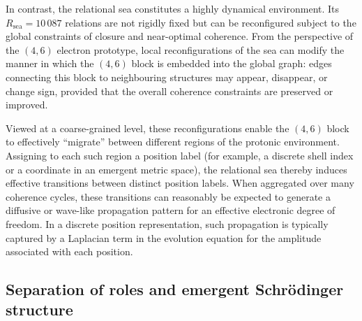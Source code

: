 \documentclass[11pt,a4paper]{article}
\begin{document}
In contrast, the relational sea constitutes a highly dynamical environment.\cite{Laubscher2026PDL_English,Laubscher2026LDP_French} Its $R_{\mathrm{sea}} = 10\,087$ relations are not rigidly fixed but can be reconfigured subject to the global constraints of closure and near-optimal coherence. From the perspective of the $(4,6)$ electron prototype, local reconfigurations of the sea can modify the manner in which the $(4,6)$ block is embedded into the global graph: edges connecting this block to neighbouring structures may appear, disappear, or change sign, provided that the overall coherence constraints are preserved or improved.\par Viewed at a coarse-grained level, these reconfigurations enable the $(4,6)$ block to effectively ``migrate'' between different regions of the protonic environment. Assigning to each such region a position label (for example, a discrete shell index or a coordinate in an emergent metric space), the relational sea thereby induces effective transitions between distinct position labels. When aggregated over many coherence cycles, these transitions can reasonably be expected to generate a diffusive or wave-like propagation pattern for an effective electronic degree of freedom. In a discrete position representation, such propagation is typically captured by a Laplacian term in the evolution equation for the amplitude associated with each position.

\subsection{Separation of roles and emergent Schr\"odinger structure}
\end{document}
